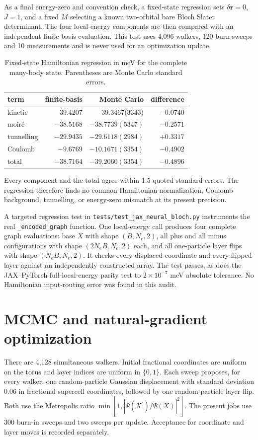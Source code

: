 As a final energy-zero and convention check, a fixed-state regression sets
$\delta\bm r=0$, $J=1$, and a fixed $M$ selecting a known two-orbital bare
Bloch Slater determinant.  The four local-energy components are then compared
with an independent finite-basis evaluation.  This test uses 4,096 walkers,
120 burn sweeps and 10 measurements and is never used for an optimization
update.
\begin{table}[H]
\centering
\caption{Fixed-state Hamiltonian regression in meV for the complete
many-body state.  Parentheses are Monte Carlo standard errors.}
\label{tab:fixedhamiltonian}
\begin{tabular}{@{}lrrr@{}}
\toprule
term & finite-basis & Monte Carlo & difference\\
\midrule
kinetic & 39.4207 & 39.3467(3343) & $-0.0740$\\
moir\'e & $-38.5168$ & $-38.7739(5347)$ & $-0.2571$\\
tunnelling & $-29.9435$ & $-29.6118(2984)$ & $+0.3317$\\
Coulomb & $-9.6769$ & $-10.1671(3354)$ & $-0.4902$\\
\midrule
total & $-38.7164$ & $-39.2060(3354)$ & $-0.4896$\\
\bottomrule
\end{tabular}
\end{table}
Every component and the total agree within 1.5 quoted standard errors.  The
regression therefore finds no common Hamiltonian normalization, Coulomb
background, tunnelling, or energy-zero mismatch at its present precision.

A targeted regression test in
\texttt{tests/test\_jax\_neural\_bloch.py} instruments the real
\texttt{\_encoded\_graph} function.  One local-energy call produces four
complete graph evaluations: base $X$ with shape $(B,N_e,2)$, all plus and all
minus configurations with shape $(2N_eB,N_e,2)$ each, and all one-particle
layer flips with shape $(N_eB,N_e,2)$.  It checks every displaced coordinate
and every flipped layer against an independently constructed array.  The test
passes, as does the JAX--PyTorch full-local-energy parity test to
$2\times10^{-7}$ meV absolute tolerance.  No Hamiltonian input-routing error
was found in this audit.

\section{MCMC and natural-gradient optimization}

There are 4,128 simultaneous walkers. Initial fractional coordinates are
uniform on the torus and layer indices are uniform in $\{0,1\}$. Each sweep
proposes, for every walker, one random-particle Gaussian displacement with
standard deviation 0.06 in fractional supercell coordinates, followed by one
random-particle layer flip. Both use the Metropolis ratio
$\min[1,|\Psi(X^\prime)/\Psi(X)|^2]$. The present jobs use 300 burn-in sweeps
and two sweeps per update. Acceptance for coordinate and layer moves is
recorded separately.


